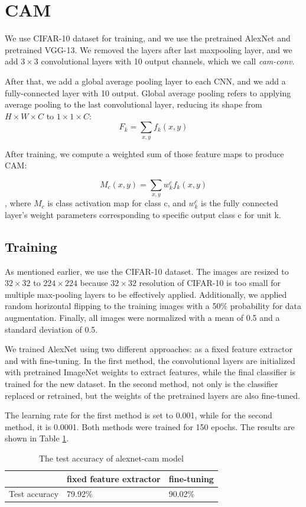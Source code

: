 \documentclass[extendedabs]{bmvc2k}
\begin{document}
\section{CAM}
We use CIFAR-10 dataset for training, and we use the pretrained AlexNet\cite{alexnet} and pretrained VGG-13\cite{vggnet}. We removed the layers after last maxpooling layer, and we add $ 3\times 3 $ convolutional layers with 10 output channels, which we call \textit{cam-conv}.

After that, we add a global average pooling layer to each CNN, and we add a fully-connected layer with 10 output. Global average pooling refers to applying average pooling to the last convolutional layer, reducing its shape from $H\times W\times C$ to $1\times 1\times C$:
$$
F_k = \sum_{x,y} f_k(x,y)
$$

After training, we compute a weighted sum of those feature maps to produce CAM:

$$
M_c(x,y) = \sum_{x,y} w^c_kf_k(x,y)
$$
, where $M_c$ is class activation map for class c, and $w^c_k$ is the fully connected layer's weight parameters corresponding to specific output class c for unit k.
\subsection{Training}
As mentioned earlier, we use the CIFAR-10 dataset. The images are resized to $32\times32$ to $224\times224$ because $32\times32$ resolution of CIFAR-10 is too small for multiple max-pooling layers to be effectively applied. Additionally, we applied random horizontal flipping to the training images with a 50\% probability for data augmentation. Finally, all images were normalized with a mean of 0.5 and a standard deviation of 0.5.

We trained AlexNet using two different approaches: as a fixed feature extractor and with fine-tuning. In the first method, the convolutional layers are initialized with pretrained ImageNet weights to extract features, while the final classifier is trained for the new dataset. In the second method, not only is the classifier replaced or retrained, but the weights of the pretrained layers are also fine-tuned.

The learning rate for the first method is set to 0.001, while for the second method, it is 0.0001. Both methods were trained for 150 epochs. The results are shown in Table \ref{tab:camresult}.

\begin{table}[]
\centering
\begin{tabular}{|l|l|l|}
\hline
              & fixed feature extractor & fine-tuning \\ \hline
Test accuracy & 79.92\%                 & 90.02\%     \\ \hline
\end{tabular}
\caption{ The test accuracy of alexnet-cam model}
\label{tab:camresult}
\end{table}
\end{document}
